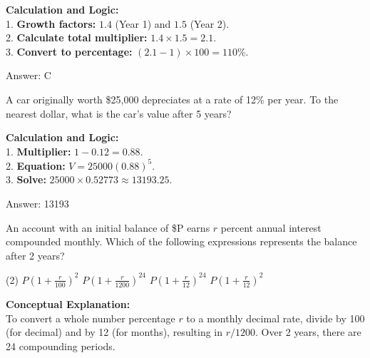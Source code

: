 \documentclass[11pt,paper=a4,answers]{exam}
\begin{document}
\begin{questions}
\begin{solution}
\textbf{Calculation and Logic:} \\
1. \textbf{Growth factors:} $1.4$ (Year 1) and $1.5$ (Year 2). \\
2. \textbf{Calculate total multiplier:} $1.4 \times 1.5 = 2.1$. \\
3. \textbf{Convert to percentage:} $(2.1 - 1) \times 100 = 110\%$.

\vspace{30pt}

Answer: \colorbox{yellow!100}{C}
\end{solution}

\vspace{60pt}

\question
A car originally worth \$25,000 depreciates at a rate of 12\% per year. To the nearest dollar, what is the car's value after 5 years?

\begin{solution}
\textbf{Calculation and Logic:} \\
1. \textbf{Multiplier:} $1 - 0.12 = 0.88$. \\
2. \textbf{Equation:} $V = 25000(0.88)^5$. \\
3. \textbf{Solve:} $25000 \times 0.52773 \approx 13193.25$.

\vspace{30pt}

Answer: \colorbox{yellow!100}{13193}
\end{solution}

\vspace{60pt}

\question
An account with an initial balance of \$P earns $r$ percent annual interest compounded monthly. Which of the following expressions represents the balance after 2 years?
\begin{tasks}(2)
    \task $P(1 + \frac{r}{100})^{2}$
    \task $P(1 + \frac{r}{1200})^{24}$
    \task $P(1 + \frac{r}{12})^{24}$
    \task $P(1 + \frac{r}{12})^{2}$
\end{tasks}

\begin{solution}
\textbf{Conceptual Explanation:} \\
To convert a whole number percentage $r$ to a monthly decimal rate, divide by 100 (for decimal) and by 12 (for months), resulting in $r/1200$. Over 2 years, there are 24 compounding periods.


\end{solution}
\end{questions}
\end{document}
